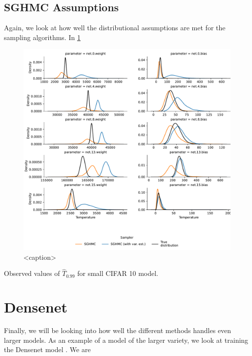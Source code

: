 \subsection{SGHMC Assumptions}
Again, we look at how well the distributional assumptions are met for the sampling algorithms.
In \cref{fig:cifar-small-temperatures}
\begin{figure}[htbp]
    \centering
    \includegraphics[width=\linewidth]{Figures/cifar-small-temperatures.pdf}
    \caption{<caption>}
    \label{fig:cifar-small-temperatures}
\end{figure}

\begin{table}[htbp]
    \centering
    
    \caption{Observed values of $\hat{T}_{0.99}$ for small CIFAR 10 model.}
    \label{tab:cifar-small-temperatures}
\end{table}

\FloatBarrier
\section{Densenet}
Finally, we will be looking into how well the different methods handles even larger models.
As an example of a model of the larger variety, we look at training the Densenet model \cite{huang_densely_2017}.
We are 

